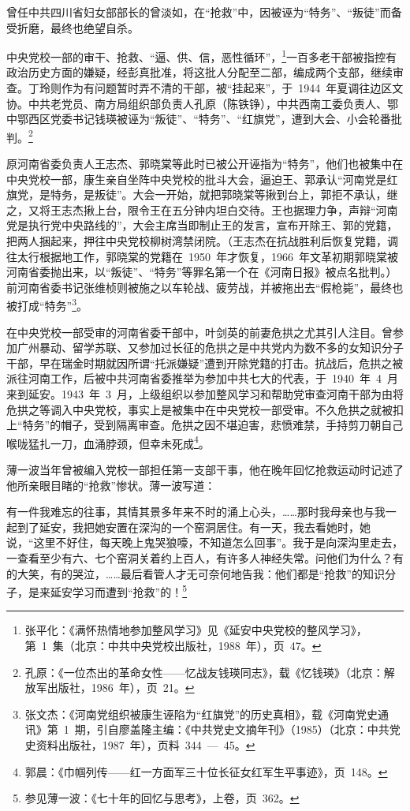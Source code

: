 曾任中共四川省妇女部部长的曾淡如，在“抢救”中，因被诬为“特务”、“叛徒”而备受折磨，最终也绝望自杀。

中央党校一部的审干、抢救、“逼、供、信，恶性循环”，\footnote{张平化：《满怀热情地参加整风学习》见《延安中央党校的整风学习》，第~1~集（北京：中共中央党校出版社，1988~年），页~47。}一百多老干部被指控有政治历史方面的嫌疑，经彭真批准，将这批人分配至二部，编成两个支部，继续审查。丁玲则作为有问题暂时弄不清的干部，被“挂起来”，于~1944~年夏调往边区文协。中共老党员、南方局组织部负责人孔原（陈铁铮），中共西南工委负责人、鄂中鄂西区党委书记钱瑛被诬为“叛徒”、“特务”、“红旗党”，遭到大会、小会轮番批判。\footnote{孔原：《一位杰出的革命女性——忆战友钱瑛同志》，载《忆钱瑛》（北京：解放军出版社，1986~年），页~21。}

原河南省委负责人王志杰、郭晓棠等此时已被公开诬指为“特务”，他们也被集中在中央党校一部，康生亲自坐阵中央党校的批斗大会，逼迫王、郭承认“河南党是红旗党，是特务，是叛徒”。大会一开始，就把郭晓棠等揪到台上，郭拒不承认，继之，又将王志杰揪上台，限令王在五分钟内坦白交待。王也据理力争，声辩“河南党是执行党中央路线的”，大会主席当即制止王的发言，宣布开除王、郭的党籍，把两人捆起来，押往中央党校柳树湾禁闭院。（王志杰在抗战胜利后恢复党籍，调往太行根据地工作，郭晓棠的党籍在~1950~年才恢复，1966~年文革初期郭晓棠被河南省委抛出来，以“叛徒”、“特务”等罪名第一个在《河南日报》被点名批判。）前河南省委书记张维桢则被施之以车轮战、疲劳战，并被拖出去“假枪毙”，最终也被打成“特务”\footnote{张文杰：《河南党组织被康生诬陷为“红旗党”的历史真相》，载《河南党史通讯》第~1~期，引自廖盖隆主编：《中共党史文摘年刊》（1985）（北京：中共党史资料出版社，1987~年），页料~344~—~45。}。

在中央党校一部受审的河南省委干部中，叶剑英的前妻危拱之尤其引人注目。曾参加广州暴动、留学苏联、又参加过长征的危拱之是中共党内为数不多的女知识分子干部，早在瑞金时期就因所谓“托派嫌疑”遭到开除党籍的打击。抗战后，危拱之被派往河南工作，后被中共河南省委推举为参加中共七大的代表，于~1940~年~4~月来到延安。1943~年~3~月，上级组织以参加整风学习和帮助党审查河南干部为由将危拱之等调入中央党校，事实上是被集中在中央党校一部受审。不久危拱之就被扣上“特务”的帽子，受到隔离审查。危拱之因不堪迫害，悲愤难禁，手持剪刀朝自己喉咙猛扎一刀，血涌脖颈，但幸未死成\footnote{郭晨：《巾帼列传——红一方面军三十位长征女红军生平事迹》，页~148。}。

薄一波当年曾被编入党校一部担任第一支部干事，他在晚年回忆抢救运动时记述了他所亲眼目睹的“抢救”惨状。薄一波写道：

\begin{quoting}
有一件我难忘的往事，其情其景多年来不时的涌上心头，……那时我母亲也与我一起到了延安，我把她安置在深沟的一个窑洞居住。有一天，我去看她时，她说，“这里不好住，每天晚上鬼哭狼嚎，不知道怎么回事”。我于是向深沟里走去，一查看至少有六、七个窑洞关着约上百人，有许多人神经失常。问他们为什么？有的大笑，有的哭泣，……最后看管人才无可奈何地告我：他们都是“抢救”的知识分子，是来延安学习而遭到“抢救”的！\footnote{参见薄一波：《七十年的回忆与思考》，上卷，页~362。}
\end{quoting}

